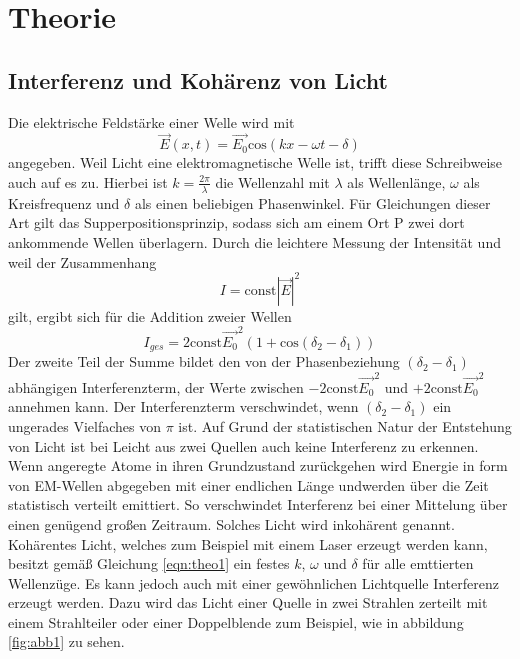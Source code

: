 \section{Theorie}
\label{sec:Theorie}

\subsection{Interferenz und Kohärenz von Licht}
\label{sec:theo1}

Die elektrische Feldstärke einer Welle wird mit
\begin{equation}
    \vec{E}(x,t) = \vec{E_0}\text{cos}(kx - \omega t - \delta)
    \label{eqn:theo1}
\end{equation}
angegeben.
Weil Licht eine elektromagnetische Welle ist, trifft diese Schreibweise auch auf es zu.
Hierbei ist $k = \frac{2 \pi}{\lambda}$ die Wellenzahl mit $\lambda$ als Wellenlänge, $\omega$ als Kreisfrequenz und $\delta$ als einen beliebigen Phasenwinkel.
Für Gleichungen dieser Art gilt das Supperpositionsprinzip, sodass sich am einem Ort P zwei dort ankommende Wellen überlagern.
Durch die leichtere Messung der Intensität und weil der Zusammenhang
\begin{equation}
    I = \text{const} |\vec{E}|^2
\end{equation}
gilt, ergibt sich für die Addition zweier Wellen
\begin{equation}
    I_{ges} = 2\text{const} \vec{E_0}^2(1+\text{cos}(\delta_2-\delta_1))
\end{equation}
Der zweite Teil der Summe bildet den von der Phasenbeziehung $(\delta_2-\delta_1)$ abhängigen Interferenzterm, der Werte zwischen $-2\text{const} \vec{E_0}^2$ und $+2\text{const} \vec{E_0}^2$ annehmen kann.
Der Interferenzterm verschwindet, wenn $(\delta_2-\delta_1)$ ein ungerades Vielfaches von $\pi$ ist.
Auf Grund der statistischen Natur der Entstehung von Licht ist bei Leicht aus zwei Quellen auch keine Interferenz zu erkennen.
Wenn angeregte Atome in ihren Grundzustand zurückgehen wird Energie in form von EM-Wellen abgegeben mit einer endlichen Länge undwerden über die Zeit statistisch verteilt emittiert.
So verschwindet Interferenz bei einer Mittelung über einen genügend großen Zeitraum.
Solches Licht wird inkohärent genannt.
Kohärentes Licht, welches zum Beispiel mit einem Laser erzeugt werden kann, besitzt gemäß Gleichung \ref{eqn:theo1} ein festes $k$, $\omega$ und $\delta$ für alle emttierten Wellenzüge.
Es kann jedoch auch mit einer gewöhnlichen Lichtquelle Interferenz erzeugt werden.
Dazu wird das Licht einer Quelle in zwei Strahlen zerteilt mit einem Strahlteiler oder einer Doppelblende zum Beispiel, wie in abbildung \ref{fig:abb1} zu sehen.
